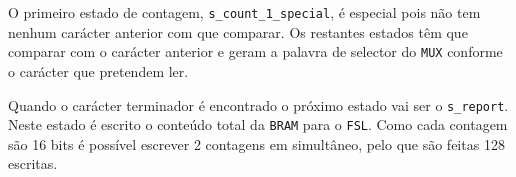  O primeiro estado de contagem, \texttt{s\_count\_1\_special}, é especial pois não tem nenhum carácter anterior com que comparar. Os restantes estados têm que comparar com o carácter anterior e geram a palavra de selector do \texttt{MUX} conforme o carácter que pretendem ler.

  Quando o carácter terminador é encontrado o próximo estado vai ser o \texttt{s\_report}. Neste estado é escrito o conteúdo total da \texttt{BRAM} para o \texttt{FSL}. Como cada contagem são 16 bits é possível escrever 2 contagens em simultâneo, pelo que são feitas 128 escritas.
